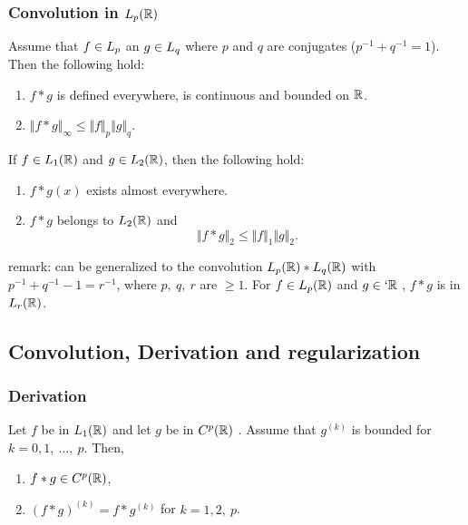 \begin{frame}
\frametitle{Convolution in $L_{p}(\mathbb{R})$}
\begin{theorem}
Assume that $f\in L_{p}$ an $g\in L_{q}$ where $p$ and $q$ are conjugates ($p^{-1} + q^{-1}=1$).
Then the following hold:
\begin{enumerate}[label=(\roman*)]
\item $f*g$  is defined everywhere, is continuous  and  bounded on $\mathbb{R}$.
\item $\Vert f*g\Vert_{\infty}\leq\Vert f\Vert_{p}\Vert g\Vert_{q}$.
\end{enumerate}
\end{theorem}
\end{frame}

\begin{frame}
\begin{theorem}
If $f\in L_1(\mathbb{R})$ and $g\in L_2(\mathbb{R})$, then the following hold:
\begin{enumerate}[label=(\roman*)]
\item $f*g(x)$ exists almost everywhere.
\item $f*g$ belongs to  $L_2(\mathbb{R})$ and
$$
\Vert f*g\Vert_{2}\leq\Vert f\Vert_{1}\Vert g\Vert_{2} .
$$
\end{enumerate}
\end{theorem}
\alert{remark:}  can be generalized to the convolution $L_{p}(\mathbb{R})*L_{q}(\mathbb{R})$ with $p^{-1}+q^{-1}-1=r^{-1}$, where $p,\ q,\ r$ are $\geq 1$. For $f\in L_{p}(\mathbb{R})$ and $ g\in \lq{\rset}$ , $f*g$ is in $L_{r}(\mathbb{R})$.
\end{frame}

\subsection{Convolution, Derivation and regularization}

\begin{frame}
\frametitle{Derivation}
\begin{theorem}
Let $f$ be in $L_1(\mathbb{R})$ and let $g$ be in $C^{p}(\mathbb{R})$ .  Assume that $g^{(k)}$ is bounded for $k=0,1,\ \ldots,\ p$. Then,
\begin{enumerate}[label=(\roman*)]
\item $ f*g\in C^{p}(\mathbb{R})$,
\item  $(f*g)^{(k)}=f*g^{(k)}$  for $k=1,2,\ p$.
\end{enumerate}
\end{theorem}
\end{frame}

